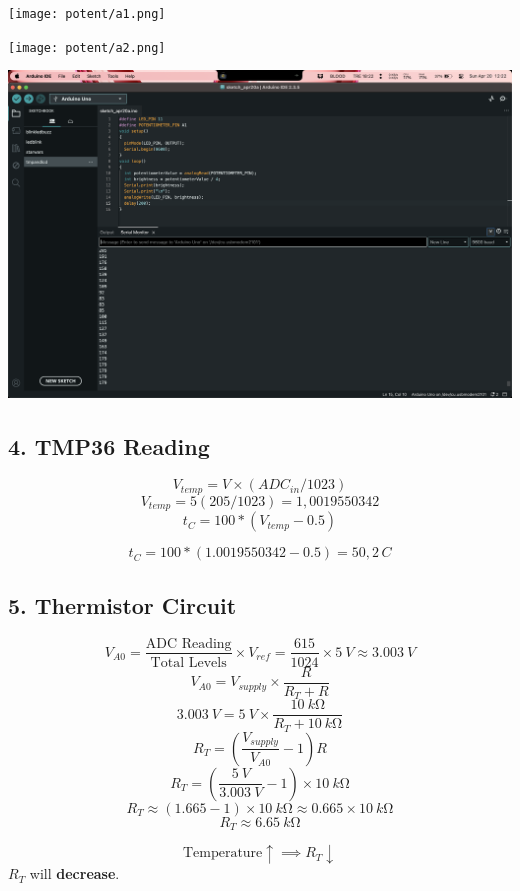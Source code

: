 \documentclass{article}
\begin{document}
\begin{center}
\begin{minipage}[t]{0.45\textwidth}
    \texttt{[image: potent/a1.png]}
\end{minipage}%
\hfill
\begin{minipage}[t]{0.45\textwidth}
    \texttt{[image: potent/a2.png]}
\end{minipage}

    \includegraphics[width=\textwidth]{potent/a4.png}
\end{center}

\subsection*{4. TMP36 Reading}

$$V_{temp}=  V \times (ADC_{in} / 1023)$$
$$V_{temp} = 5 (205 / 1023) = 1,0019550342 $$
\[
  t_{C} = 100 * (V_{temp} - 0.5)
\]

\[
  t_{C} = 100 * (1.0019550342 - 0.5) = 50,2 \, C 
\]


\subsection*{5. Thermistor Circuit}

    \[ V_{A0} = \frac{\text{ADC Reading}}{\text{Total Levels}} \times V_{ref} = \frac{615}{1024} \times \SI{5}{V} \approx \SI{3.003}{V} \]
    \[ V_{A0} = V_{supply} \times \frac{R}{R_T + R} \]
    \[ \SI{3.003}{V} = \SI{5}{V} \times \frac{\SI{10}{k\ohm}}{R_T + \SI{10}{k\ohm}} \]
        \[ R_T = \left( \frac{V_{supply}}{V_{A0}} - 1 \right) R \]
        \[ R_T = \left( \frac{\SI{5}{V}}{\SI{3.003}{V}} - 1 \right) \times \SI{10}{k\ohm} \]
        \[ R_T \approx (1.665 - 1) \times \SI{10}{k\ohm} \approx 0.665 \times \SI{10}{k\ohm} \]
        \[ R_T \approx \SI{6.65}{k\ohm} \]

\[ \text{Temperature} \uparrow \implies R_T \downarrow \]
$R_T$ will \textbf{decrease}.
\end{document}
